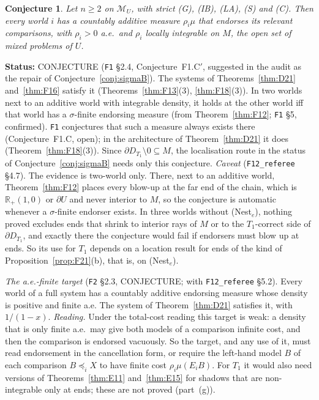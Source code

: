 \documentclass[11pt]{article}
\newtheorem{conjecture}[theorem]{Conjecture}
\theoremstyle{definition}
\theoremstyle{remark}
\newcommand{\R}{\mathbb R}
\newcommand{\M}{\mathcal M}
\newcommand{\src}[1]{\texttt{#1}}
\newcommand{\status}[1]{\par\smallskip\noindent\textbf{Status:} #1\par\smallskip}
\begin{document}
\begin{conjecture}\label{conj:F1Cp}
Let $n\ge2$ on $\M_U$, with strict (G), (IB), (LA), (S) and (C). Then every world $i$ has a countably additive measure $\rho_i\mu$ that endorses its relevant comparisons, with $\rho_i>0$ a.e.\ and $\rho_i$ locally integrable on $M$, the open set of mixed problems of $U$.
\end{conjecture}
\status{CONJECTURE (\src{F1} \S2.4, Conjecture~F1.C$'$, suggested in the audit as the repair of Conjecture~\ref{conj:sigmaB}). The systems of Theorems~\ref{thm:D21} and~\ref{thm:F16} satisfy it (Theorems~\ref{thm:F13}(3), \ref{thm:F18}(3)). In two worlds next to an additive world with integrable density, it holds at the other world iff that world has a $\sigma$-finite endorsing measure (from Theorem~\ref{thm:F12}; \src{F1} \S5, confirmed). \src{F1} conjectures that such a measure always exists there (Conjecture~F1.C, open); in the architecture of Theorem~\ref{thm:D21} it does (Theorem~\ref{thm:F18}(3)). Since $\partial D_{T_1}\setminus0\subseteq M$, the localisation route in the status of Conjecture~\ref{conj:sigmaB} needs only this conjecture. \emph{Caveat} (\src{F12\_referee} \S4.7). The evidence is two-world only. There, next to an additive world, Theorem~\ref{thm:F12} places every blow-up at the far end of the chain, which is $\R_+(1,0)$ or $\partial U$ and never interior to $M$, so the conjecture is automatic whenever a $\sigma$-finite endorser exists. In three worlds without (Nest$_e$), nothing proved excludes ends that shrink to interior rays of $M$ or to the $T_1$-correct side of $\partial D_{T_1}$, and exactly there the conjecture would fail if endorsers must blow up at ends. So its use for $T_1$ depends on a location result for ends of the kind of Proposition~\ref{prop:F21}(b), that is, on (Nest$_e$).}

\emph{The a.e.-finite target} (\src{F2} \S2.3, CONJECTURE; with \src{F12\_referee} \S5.2). Every world of a full system has a countably additive endorsing measure whose density is positive and finite a.e. The system of Theorem~\ref{thm:D21} satisfies it, with $1/(1-x)$. \emph{Reading.} Under the total-cost reading this target is weak: a density that is only finite a.e.\ may give both models of a comparison infinite cost, and then the comparison is endorsed vacuously. So the target, and any use of it, must read endorsement in the cancellation form, or require the left-hand model $B$ of each comparison $B\preceq_iX$ to have finite cost $\rho_i\mu(E_iB)$. For $T_1$ it would also need versions of Theorems~\ref{thm:E11} and~\ref{thm:E15} for shadows that are non-integrable only at ends; these are not proved (part~(g)).
\end{document}
